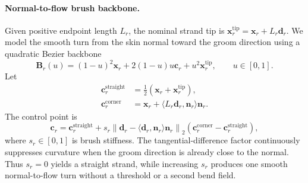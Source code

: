 \paragraph{Normal-to-flow brush backbone.}
Given positive endpoint length $L_r$, the nominal strand tip is
$\mathbf{x}^{\mathrm{tip}}_r=\mathbf{x}_r+L_r\mathbf{d}_r$.
We model the smooth turn from the skin normal toward the groom direction using
a quadratic Bezier backbone
\begin{equation}
    \mathbf{B}_r(u)=(1-u)^2\mathbf{x}_r
    +2(1-u)u\mathbf{c}_r+u^2\mathbf{x}^{\mathrm{tip}}_r,
    \qquad u\in[0,1].
\end{equation}
Let
\begin{align}
    \mathbf{c}^{\mathrm{straight}}_r
        &=\tfrac{1}{2}(\mathbf{x}_r+\mathbf{x}^{\mathrm{tip}}_r),\\
    \mathbf{c}^{\mathrm{corner}}_r
        &=\mathbf{x}_r+
        \langle L_r\mathbf{d}_r,\mathbf{n}_r\rangle\mathbf{n}_r.
\end{align}
The control point is
\begin{equation}
    \mathbf{c}_r=\mathbf{c}^{\mathrm{straight}}_r+
    s_r\left\lVert
        \mathbf{d}_r-\langle\mathbf{d}_r,\mathbf{n}_r\rangle\mathbf{n}_r
    \right\rVert_2
    (\mathbf{c}^{\mathrm{corner}}_r-\mathbf{c}^{\mathrm{straight}}_r),
\end{equation}
where $s_r\in[0,1]$ is brush stiffness. The tangential-difference factor
continuously suppresses curvature when the groom direction is already close to
the normal. Thus $s_r=0$ yields a straight strand, while increasing $s_r$
produces one smooth normal-to-flow turn without a threshold or a second bend
field.


